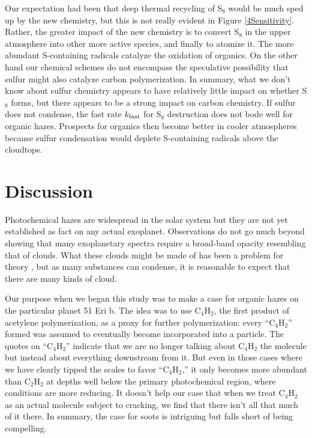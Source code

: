 \documentclass[preprint]{aastex}
\begin{document}
Our expectation had been that deep thermal recycling of S$_8$ would be much sped up by the new chemistry, but this is
not really evident in Figure \ref{4Sensitivity}.  Rather, the greater impact of the new chemistry is
to convert S$_8$ in the upper atmosphere into other more active species, and finally to atomize it.
The more abundant S-containing radicals catalyze the oxidation of organics.
On the other hand our chemical schemes do not encompass the speculative possibility that sulfur
might also catalyze carbon polymerization. 
 In summary, what we don't know about sulfur chemistry appears to have relatively little impact on 
 whether S$_8$ forms, but there appears to be a strong impact on carbon chemistry. 
 If sulfur does not condense, the fast rate $k_{\rm fast}$ for S$_8$ destruction does not bode well for organic hazes.
 Prospects for organics then become better in cooler atmospheres
  because sulfur condensation would deplete S-containing radicals above the cloudtops.
 

\section{Discussion}

Photochemical hazes are widespread in the solar system 
but they are not yet established as fact on any actual exoplanet.
Observations do not go much beyond showing that many exoplanetary spectra require a broad-band opacity
resembling that of clouds.  
What these clouds might be made of has been a problem for theory \citep{Helling2014,Morley2015},
but as many substances can condense, it is reasonable to expect that there are many kinds of cloud.

Our purpose when we began this study was to make a case for organic hazes on the particular planet 51 Eri b.
The idea was to use C$_4$H$_2$, the first product of acetylene polymerization, as a
proxy for further polymerization: every ``C$_4$H$_2$'' formed was assumed to eventually become incorporated into a particle.
The quotes on ``C$_4$H$_2$'' indicate that we are no longer
talking about C$_4$H$_2$ the molecule but instead about everything downstream from it. 
But even in those cases where we have clearly tipped the scales to favor ``C$_4$H$_2$,''
 it only becomes more abundant than C$_2$H$_2$ at depths well below the primary photochemical region, 
 where conditions are more reducing.
It doesn't help our case that when we treat C$_4$H$_2$ as an actual molecule subject to cracking,
we find that there isn't all that much of it there.
In summary, the case for soots is intriguing but falls short of being compelling. %
\end{document}
